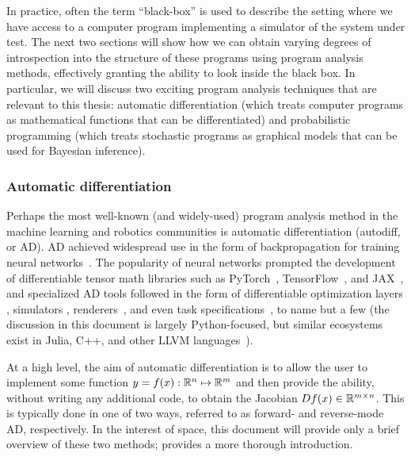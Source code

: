 In practice, often the term ``black-box'' is used to describe the setting where we have access to a computer program implementing a simulator of the system under test. The next two sections will show how we can obtain varying degrees of introspection into the structure of these programs using program analysis methods, effectively granting the ability to look inside the black box. In particular, we will discuss two exciting program analysis techniques that are relevant to this thesis: automatic differentiation (which treats computer programs as mathematical functions that can be differentiated) and probabilistic programming (which treats stochastic programs as graphical models that can be used for Bayesian inference).

\subsubsection{Automatic differentiation}

Perhaps the most well-known (and widely-used) program analysis method in the machine learning and robotics communities is automatic differentiation (autodiff, or AD). AD achieved widespread use in the form of backpropagation for training neural networks~\cite{rumelhartLearningRepresentationsBackpropagating1986}. The popularity of neural networks prompted the development of differentiable tensor math libraries such as PyTorch~\cite{pytorch}, TensorFlow~\cite{tensorflow2015-whitepaper}, and JAX~\cite{jax2018github}, and specialized AD tools followed in the form of differentiable optimization layers \cite{agrawalDifferentiableConvexOptimization2019}, simulators \cite{huDiffTaichiDifferentiableProgramming2019}, renderers~\cite{huDiffTaichiDifferentiableProgramming2019,lelidecDifferentiableRenderingPerturbed2021}, and even task specifications~\cite{leungBackPropagationSignalTemporal2021}, to name but a few (the discussion in this document is largely Python-focused, but similar ecosystems exist in Julia, C++, and other LLVM languages~\cite{NEURIPS2020_9332c513}).

At a high level, the aim of automatic differentiation is to allow the user to implement some function $y = f(x): \mathbb{R}^n \mapsto \mathbb{R}^m$ and then provide the ability, without writing any additional code, to obtain the Jacobian $Df(x) \in \mathbb{R}^{m\times n}$. This is typically done in one of two ways, referred to as forward- and reverse-mode AD, respectively. In the interest of space, this document will provide only a brief overview of these two methods; \cite{AutodiffCookbookJAX} provides a more thorough introduction.

